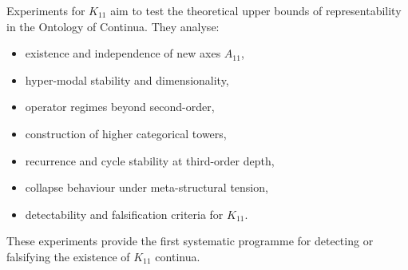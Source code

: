 Experiments for $K_{11}$ aim to test the theoretical upper bounds of 
representability in the Ontology of Continua.  
They analyse:

\begin{itemize}
    \item existence and independence of new axes $A_{11}$,
    \item hyper-modal stability and dimensionality,
    \item operator regimes beyond second-order,
    \item construction of higher categorical towers,
    \item recurrence and cycle stability at third-order depth,
    \item collapse behaviour under meta-structural tension,
    \item detectability and falsification criteria for $K_{11}$.
\end{itemize}

These experiments provide the first systematic programme for detecting 
or falsifying the existence of $K_{11}$ continua.

